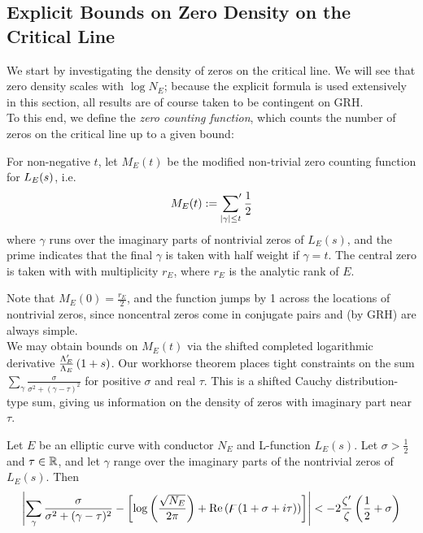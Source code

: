 \subsection{Explicit Bounds on Zero Density on the Critical Line}

We start by investigating the density of zeros on the critical line. We will see that zero density scales with $\log N_E$; because the explicit formula is used extensively in this section, all results are of course taken to be contingent on GRH. \\

To this end, we define the {\it zero counting function}, which counts the number of zeros on the critical line up to a given bound:
\begin{definition}\label{defn:zero_counting_function}
For non-negative $t$, let $M_E(t)$ be the modified non-trivial zero counting function for $L_E(s)$, i.e.
\begin{equation}
M_E(t) := \sideset{}{^{\prime}}\sum_{|\gamma| \le t} \frac{1}{2}
\end{equation}
where $\gamma$ runs over the imaginary parts of nontrivial zeros of $L_E(s)$, and the prime indicates that the final $\gamma$ is taken with half weight if $\gamma = t$. The central zero is taken with with multiplicity $r_E$, where $r_E$ is the analytic rank of $E$.
\end{definition}

Note that $M_E(0) = \frac{r_E}{2}$, and the function jumps by 1 across the locations of nontrivial zeros, since noncentral zeros come in conjugate pairs and (by GRH) are always simple. \\

%

We may obtain bounds on $M_E(t)$ via the shifted completed logarithmic derivative $\frac{\Lambda_E^{\prime}}{\Lambda_E}\left(1+s\right)$. Our workhorse theorem places tight constraints on the sum $\sum_\gamma \frac{\sigma}{\sigma^2+(\gamma-\tau)^2}$ for positive $\sigma$ and real $\tau$. This is a shifted Cauchy distribution-type sum, giving us information on the density of zeros with imaginary part near $\tau$.
\begin{theorem}[GRH]
\label{thm:poisson_sum_bound}
Let $E$ be an elliptic curve with conductor $N_E$ and L-function $L_E(s)$. Let $\sigma > \frac{1}{2}$ and $\tau \in \mathbb{R}$, and let $\gamma$ range over the imaginary parts of the nontrivial zeros of $L_E(s)$. Then
\begin{equation}
 \left| \sum_\gamma \frac{\sigma}{\sigma^2+(\gamma-\tau)^2} - \left[\log\left(\frac{\sqrt{N_E}}{2\pi}\right) + \mbox{\rm Re}\left(\digamma(1+\sigma+i \tau)\right)\right] \right| < - 2\frac{\zeta^{\prime}}{\zeta}\left(\frac{1}{2}+\sigma\right)
\end{equation}
\end{theorem}

